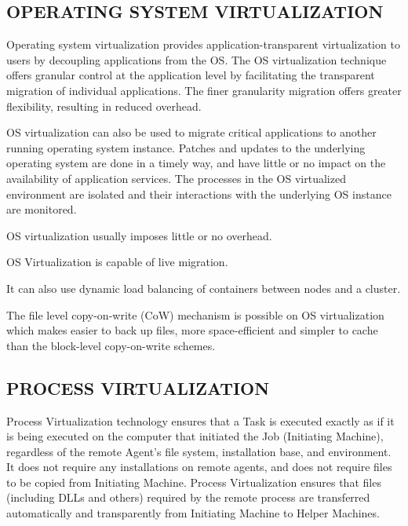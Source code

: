 \subsection{OPERATING SYSTEM VIRTUALIZATION}

Operating system virtualization provides application-transparent virtualization to users by decoupling applications from the OS. The OS virtualization technique offers granular control at the application level by facilitating the transparent migration of individual applications. The finer granularity migration offers greater flexibility, resulting in reduced overhead.

OS virtualization can also be used to migrate critical applications to another running operating system instance. Patches and updates to the underlying operating system are done in a timely way, and have little or no impact on the availability of application services. The processes in the OS virtualized environment are isolated and their interactions with the underlying OS instance are monitored.

\begin{description}
\item[Advantages of OS virtualization]
\item OS virtualization usually imposes little or no overhead.

OS Virtualization is capable of live migration.

It can also use dynamic load balancing of containers between nodes and a cluster.

The file level copy-on-write (CoW) mechanism is possible on OS virtualization which makes easier to back up files, more space-efficient and simpler to cache than the block-level copy-on-write schemes.
\end{description}


\subsection{PROCESS VIRTUALIZATION}
\label{sec:sim}

Process Virtualization technology ensures that a Task is executed exactly as if it is being executed on the computer that initiated the Job (Initiating Machine), regardless of the remote Agent's file system, installation base, and environment. It does not require any installations on remote agents, and does not require files to be copied from Initiating Machine. Process Virtualization ensures that files (including DLLs and others) required by the remote process are transferred automatically and transparently from Initiating Machine to Helper Machines.


